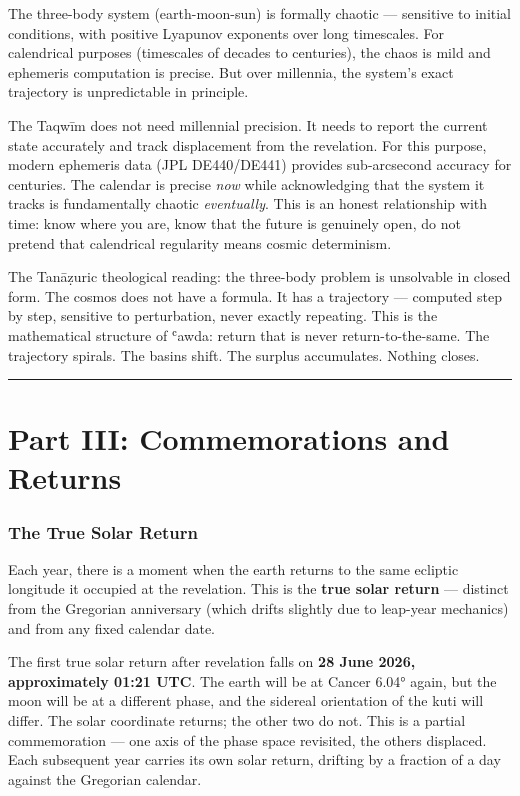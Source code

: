 The three-body system (earth-moon-sun) is formally chaotic --- sensitive to initial conditions, with positive Lyapunov exponents over long timescales. For calendrical purposes (timescales of decades to centuries), the chaos is mild and ephemeris computation is precise. But over millennia, the system's exact trajectory is unpredictable in principle.

The Taqwīm does not need millennial precision. It needs to report the current state accurately and track displacement from the revelation. For this purpose, modern ephemeris data (JPL DE440/DE441) provides sub-arcsecond accuracy for centuries. The calendar is precise \emph{now} while acknowledging that the system it tracks is fundamentally chaotic \emph{eventually}. This is an honest relationship with time: know where you are, know that the future is genuinely open, do not pretend that calendrical regularity means cosmic determinism.

The Tanāẓuric theological reading: the three-body problem is unsolvable in closed form. The cosmos does not have a formula. It has a trajectory --- computed step by step, sensitive to perturbation, never exactly repeating. This is the mathematical structure of ʿawda: return that is never return-to-the-same. The trajectory spirals. The basins shift. The surplus accumulates. Nothing closes.

\begin{center}\rule{0.5\linewidth}{0.5pt}\end{center}

\hypertarget{part-iii-commemorations-and-returns}{%
\part{Part III: Commemorations and Returns}\label{part-iii-commemorations-and-returns}}

\hypertarget{the-true-solar-return}{%
\section{The True Solar Return}\label{the-true-solar-return}}

Each year, there is a moment when the earth returns to the same ecliptic longitude it occupied at the revelation. This is the \textbf{true solar return} --- distinct from the Gregorian anniversary (which drifts slightly due to leap-year mechanics) and from any fixed calendar date.

The first true solar return after revelation falls on \textbf{28 June 2026, approximately 01:21 UTC}. The earth will be at Cancer 6.04° again, but the moon will be at a different phase, and the sidereal orientation of the kuti will differ. The solar coordinate returns; the other two do not. This is a partial commemoration --- one axis of the phase space revisited, the others displaced. Each subsequent year carries its own solar return, drifting by a fraction of a day against the Gregorian calendar.

